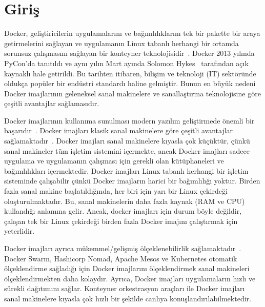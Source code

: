 

\chapter{Giriş}
\vspace{12pt}

Docker, geliştiricilerin uygulamalarını ve bağımlılıklarını tek bir pakette bir araya getirmelerini sağlayan ve uygulamanın Linux tabanlı herhangi bir ortamda sorunsuz çalışmasını sağlayan bir konteyner teknolojisidir~\autocite{haque2020challenges}. Docker 2013 yılında PyCon'da tanıtıldı ve aynı yılın Mart ayında Solomon Hykes~\autocite{ThefutureofLinuxContainers} tarafından açık kaynaklı hale getirildi. Bu tarihten itibaren, bilişim ve teknoloji (IT) sektöründe oldukça popüler bir endüstri standardı haline gelmiştir. Bunun en büyük nedeni Docker imajlarının geleneksel sanal makinelere ve sanallaştırma teknolojisine göre çeşitli avantajlar sağlamasıdır.

Docker imajlarının kullanıma sunulması modern yazılım geliştirmede  önemli bir başarıdır~\autocite{prado2022}. Docker imajları klasik sanal makinelere göre çeşitli avantajlar sağlamaktadır~\autocite{zhang2018comparative}. Docker imajları sanal makinelere kıyasla çok küçüktür, çünkü sanal makineler tüm işletim sistemini içermekte, ancak Docker imajları sadece uygulama ve uygulamanın çalışması için gerekli olan kütüphaneleri ve bağımlılıkları içermektedir. Docker imajları Linux tabanlı herhangi bir işletim sisteminde çalışabilir çünkü Docker imajların harici bir bağımlılığı yoktur. Birden fazla sanal makine başlatıldığında, her biri için yarı bir Linux çekirdeği oluşturulmaktadır. Bu, sanal makinelerin daha fazla kaynak (RAM ve CPU) kullandığı anlamına gelir. Ancak, docker imajları için durum böyle değildir, çalışan tek bir Linux çekirdeği birden fazla Docker imajını çalıştırmak için yeterlidir.

Docker imajları ayrıca mükemmel/gelişmiş ölçeklenebilirlik sağlamaktadır~\autocite{8125559}. Docker Swarm, Hashicorp Nomad, Apache Mesos ve Kubernetes otomatik ölçeklendirme sağladığı için Docker imajlarını ölçeklendirmek sanal makineleri ölçeklendirmekten daha kolaydır. Ayrıca, Docker imajları uygulamaların hızlı ve sürekli dağıtımını sağlar. Konteyner orkestrasyon araçları ile Docker imajları sanal makinelere kıyasla çok hızlı bir şekilde canlıya konuşlandırılabilmektedir.

